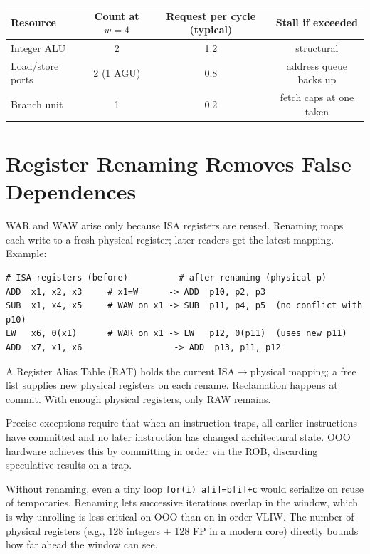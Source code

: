 \begin{center}
\begin{tabular}{lccc}
\toprule Resource & Count at $w=4$ & Request per cycle (typical) & Stall if exceeded \\ \midrule
Integer ALU & 2 & 1.2 & structural \\
Load/store ports & 2 (1 AGU) & 0.8 & address queue backs up \\
Branch unit & 1 & 0.2 & fetch caps at one taken \\ \bottomrule
\end{tabular}
\end{center}

\section{Register Renaming Removes False Dependences}
WAR and WAW arise only because ISA registers are reused. Renaming maps each write to a fresh physical register; later readers get the latest mapping. Example:
\begin{lstlisting}[language={[x86masm]Assembler}, caption={Renaming eliminates WAR/WAW}, label={lst:rename}]
# ISA registers (before)          # after renaming (physical p)
ADD  x1, x2, x3     # x1=W      -> ADD  p10, p2, p3
SUB  x1, x4, x5     # WAW on x1 -> SUB  p11, p4, p5  (no conflict with p10)
LW   x6, 0(x1)      # WAR on x1 -> LW   p12, 0(p11)  (uses new p11)
ADD  x7, x1, x6                  -> ADD  p13, p11, p12
\end{lstlisting}
A Register Alias Table (RAT) holds the current ISA$\to$physical mapping; a free list supplies new physical registers on each rename. Reclamation happens at commit. With enough physical registers, only RAW remains.

\begin{definition}
Precise exceptions require that when an instruction traps, all earlier instructions have committed and no later instruction has changed architectural state. OOO hardware achieves this by committing in order via the ROB, discarding speculative results on a trap.
\end{definition}

Without renaming, even a tiny loop \texttt{for(i) a[i]=b[i]+c} would serialize on reuse of temporaries. Renaming lets successive iterations overlap in the window, which is why unrolling is less critical on OOO than on in-order VLIW. The number of physical registers (e.g., 128 integers + 128 FP in a modern core) directly bounds how far ahead the window can see.


